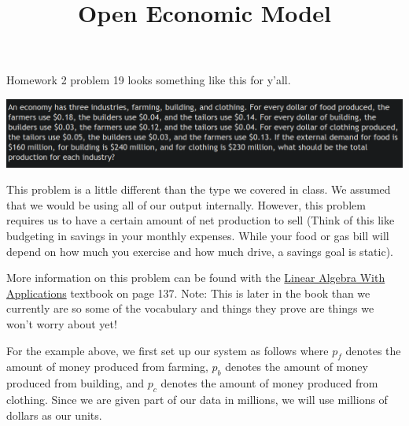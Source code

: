 \documentclass{article}
\title{Open Economic Model}
\begin{document}
    \maketitle

    Homework 2 problem 19 looks something like this for y'all.
    \\
    \begin{centering}
        \includegraphics[width=\textwidth]{images/HW2Prob19.png}
    \end{centering}

    This problem is a little different than the type we covered in class. We assumed that we would
    be using all of our output internally. However, this problem requires us to have a certain 
    amount of net production to sell (Think of this like budgeting in savings in your monthly expenses.
    While your food or gas bill will depend on how much you exercise and how much drive, a savings
    goal is static).

    More information on this problem can be found with the 
    \href{https://lyryx.com/wp-content/uploads/2018/01/Nicholson-OpenLAWA-2018A.pdf}{Linear Algebra
    With Applications} textbook on page 137. Note: This is later in the book than we currently are
    so some of the vocabulary and things they prove are things we won't worry about yet!

    For the example above, we first set up our system as follows where $p_f$ denotes the amount
    of money produced from farming, $p_b$ denotes the amount of money produced from building, and
    $p_c$ denotes the amount of money produced from clothing. Since we are given part of our data in
    millions, we will use millions of dollars as our units.
\end{document}
